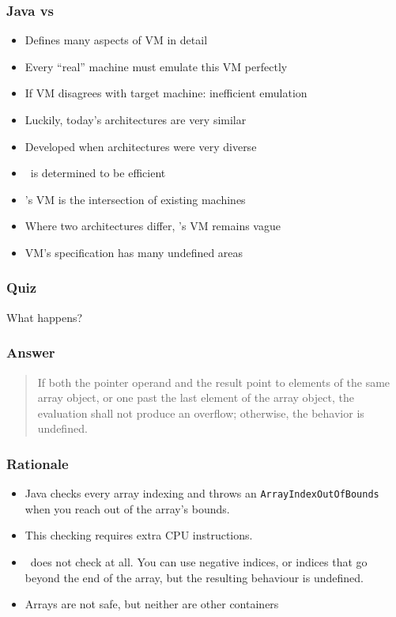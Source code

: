 \documentclass{../ucll-slides}
\begin{document}
\begin{frame}
  \frametitle{Java vs \cpp}
  \begin{itemize}
    \item Defines many aspects of VM in detail
    \item Every ``real'' machine must emulate this VM perfectly
    \item If VM disagrees with target machine: inefficient emulation
    \item Luckily, today's architectures are very similar
  \end{itemize}
  \vskip5mm
  \structure{\cpp}
  \begin{itemize}
    \item Developed when architectures were very diverse
    \item \cpp\ is determined to be efficient
    \item \cpp's VM is the intersection of existing machines
    \item Where two architectures differ, \cpp's VM remains vague
    \item VM's specification has many undefined areas
  \end{itemize}
\end{frame}

\begin{frame}
  \frametitle{Quiz}
  \begin{center}
    {\Large What happens?}\vskip1cm
  \end{center}
\end{frame}

\begin{frame}
  \frametitle{Answer}
  \begin{quote}
    If both the pointer operand and the result point to elements of the same array object, or one past
    the last element of the array object, the evaluation shall not produce an overflow; otherwise, the behavior is
    undefined.\\
    \hfill {}
  \end{quote}
\end{frame}

\begin{frame}
  \frametitle{Rationale}
  \begin{itemize}
    \item Java checks every array indexing and throws an {\tt ArrayIndexOutOfBounds}
          when you reach out of the array's bounds.
    \item This checking requires extra CPU instructions.
    \item \cpp\ does not check at all. You can use negative indices, or indices that
          go beyond the end of the array, but the resulting behaviour is undefined.
    \item Arrays are not safe, but neither are other containers
  \end{itemize}
\end{frame}
\end{document}
